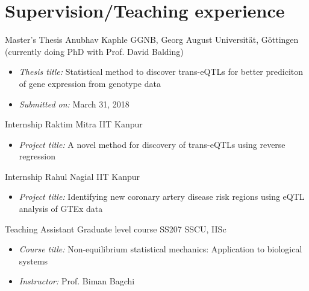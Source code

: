 \section{Supervision/Teaching experience}
        {Master's Thesis}
        {Anubhav Kaphle}
        {GGNB, Georg August Universit\"at, G\"ottingen}
        {(currently doing PhD with Prof. David Balding)}
        {\vspace{-1.0em}%
         \begin{itemize}%
         \setlength{\itemsep}{0.35em}
              \item {\itshape\color{color2} Thesis title:} %
                    Statistical method to discover trans-eQTLs for better prediciton of gene expression from genotype data
              \item {\itshape\color{color2} Submitted on:} %
                    March 31, 2018
         \end{itemize}
        }

        {Internship}
        {Raktim Mitra}
        {IIT Kanpur}
        {}
        {\vspace{-1.0em}%
         \begin{itemize}%
         \setlength{\itemsep}{0.35em}
              \item {\itshape\color{color2} Project title:} %
                    A novel method for discovery of trans-eQTLs using reverse regression
         \end{itemize}
        }

        {Internship}
        {Rahul Nagial}
        {IIT Kanpur}
        {}
        {\vspace{-1.0em}%
         \begin{itemize}%
         \setlength{\itemsep}{0.35em}
              \item {\itshape\color{color2} Project title:} %
                    Identifying new coronary artery disease risk regions using eQTL analysis of GTEx data
         \end{itemize}
        }

        {Teaching Assistant}
        {Graduate level course SS207}
        {SSCU, IISc}
        {}
        {\vspace{-1.0em}%
         \begin{itemize}%
         \setlength{\itemsep}{0.35em}
              \item {\itshape\color{color2} Course title:} %
                    Non-equilibrium statistical mechanics: Application to biological systems
              \item {\itshape\color{color2} Instructor:} Prof. Biman Bagchi
         \end{itemize}
        }

